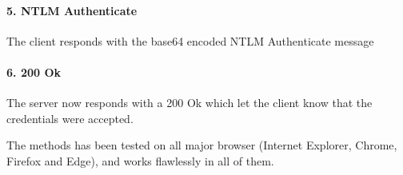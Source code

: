 \documentclass{article}
\begin{document}
\paragraph{5. NTLM Authenticate} The client responds with the base64 encoded NTLM Authenticate message
\paragraph{6. 200 Ok} The server now responds with a 200 Ok which let the client know that the credentials were accepted.

The methods has been tested on all major browser (Internet Explorer, Chrome, Firefox and Edge), and works flawlessly in all of them.
\end{document}
